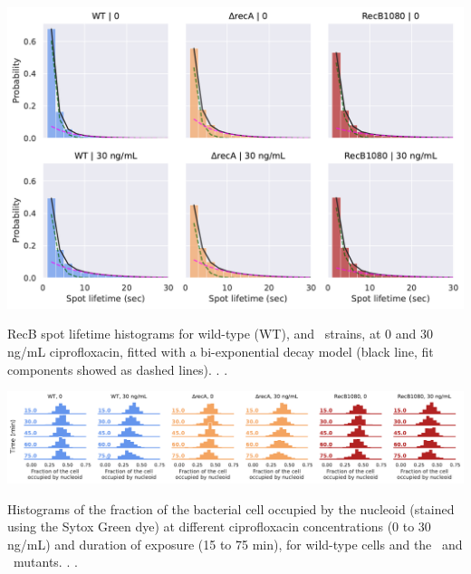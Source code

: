 \begin{suppfigure*}[htbp]
    \begin{center}
    \includegraphics[width=.8\textwidth]{SI_Figures/Mutants_RecB_fits.pdf}
    \end{center}
    \caption{RecB spot lifetime histograms for wild-type (WT), \dreca and \teneighty\ strains, at 0 and 30 ng/mL ciprofloxacin, fitted with a bi-exponential decay model (black line, fit components showed as dashed lines). . .}
    \label{SIFig:mutants_biexp_fits}
\end{suppfigure*}

\begin{suppfigure*}[htbp]
    \begin{center}
    \includegraphics[width=\textwidth]{SI_Figures/Mutants_nucleoid_compaction.pdf}
    \end{center}
    \caption{Histograms of the fraction of the bacterial cell occupied by the nucleoid (stained using the Sytox Green dye) at different ciprofloxacin concentrations (0 to 30 ng/mL) and duration of exposure (15 to 75 min), for wild-type cells and the \dreca\ and \teneighty\ mutants. . .}
    \label{SIFig:mutants_nucleoid_compaction}
\end{suppfigure*}
